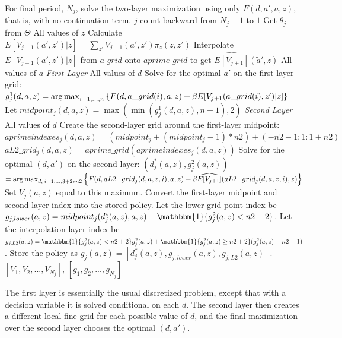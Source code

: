 \begin{algorithmic}
 \State For final period, $N_j$, solve the two-layer maximization using only $F(d,a',a,z)$, that is, with no continuation term.
 \For $j$ count backward from $N_j-1$ to $1$
   \State Get $\theta_j$ from $\Theta$
   \For All values of $z$
    \State Calculate $E[V_{j+1}(a',z')|z]=\sum_{z'} V_{j+1}(a',z') \pi_z(z,z')$
    \State Interpolate $E[V_{j+1}(a',z')|z]$ from $a\_{}grid$ onto $aprime\_{}grid$ to get $\widehat{E[V_{j+1}]}(\tilde{a}',z)$
    \For All values of $a$
     \Statex \textit{First Layer}
     \For All values of $d$
      \State Solve for the optimal $a'$ on the first-layer grid:
      \Statex \hspace{\algorithmicindent} $g_j^1(d,a,z)=\operatorname*{arg\,max}_{i=1,\dots,n} \left\{ F(d,a\_{}grid(i),a,z)+\beta E[V_{j+1}(a\_{}grid(i),z')|z] \right\}$
      \State Let $midpoint_j(d,a,z)=\max(\min(g_j^1(d,a,z),n-1),2)$
     \EndFor
     \Statex \textit{Second Layer}
     \For All values of $d$
      \State Create the second-layer grid around the first-layer midpoint:
      \Statex \hspace{\algorithmicindent} $aprimeindexes_j(d,a,z)=(midpoint_j+(midpoint_j-1)*n2)+(-n2-1:1:1+n2)$
      \Statex \hspace{\algorithmicindent} $aL2\_{}grid_j(d,a,z)=aprime\_{}grid(aprimeindexes_j(d,a,z))$
     \EndFor
     \State Solve for the optimal $(d,a')$ on the second layer:
     \Statex \hspace{\algorithmicindent} $(d_j^*(a,z),g_j^2(a,z))$
     \Statex \hspace{\algorithmicindent} $=\operatorname*{arg\,max}_{d,\;i=1,\dots,3+2*n2} \left\{ F(d,aL2\_{}grid_j(d,a,z,i),a,z)+\beta \widehat{E[V_{j+1}]}(aL2\_{}grid_j(d,a,z,i),z) \right\}$
     \State Set $V_j(a,z)$ equal to this maximum.
    \EndFor
   \EndFor
  \EndFor
  \State Convert the first-layer midpoint and second-layer index into the stored policy.
  \State Let the lower-grid-point index be $g_{j,lower}(a,z)=midpoint_j(d_j^*(a,z),a,z)-\mathbbm{1}\{g_j^2(a,z)<n2+2\}$.
  \State Let the interpolation-layer index be
  \Statex \hspace{\algorithmicindent} $g_{j,L2}(a,z)=\mathbbm{1}\{g_j^2(a,z)<n2+2\}g_j^2(a,z)+\mathbbm{1}\{g_j^2(a,z)\geq n2+2\}(g_j^2(a,z)-n2-1)$.
  \State Store the policy as $g_j(a,z)=[d_j^*(a,z),g_{j,lower}(a,z),g_{j,L2}(a,z)]$.
   \\ \Return $[V_1,V_2,...,V_{N_j}]$, $[g_1,g_2,...,g_{N_j}]$
\end{algorithmic}

The first layer is essentially the usual discretized problem, except that with a decision variable it is solved conditional on each $d$. The second layer then creates a different local fine grid for each possible value of $d$, and the final maximization over the second layer chooses the optimal $(d,a')$.

